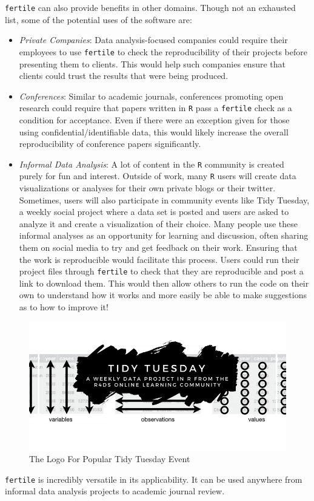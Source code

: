 \documentclass[12pt,twoside]{reedthesis}
\begin{document}
\texttt{fertile} can also provide benefits in other domains. Though not an exhausted list, some of the potential uses of the software are:
\begin{itemize}
\item
  \emph{Private Companies}: Data analysis-focused companies could require their employees to use \texttt{fertile} to check the reproducibility of their projects before presenting them to clients. This would help such companies ensure that clients could trust the results that were being produced.
\item
  \emph{Conferences}: Similar to academic journals, conferences promoting open research could require that papers written in \texttt{R} pass a \texttt{fertile} check as a condition for acceptance. Even if there were an exception given for those using confidential/identifiable data, this would likely increase the overall reproducibility of conference papers significantly.
\item
  \emph{Informal Data Analysis}: A lot of content in the \texttt{R} community is created purely for fun and interest. Outside of work, many \texttt{R} users will create data visualizations or analyses for their own private blogs or their twitter. Sometimes, users will also participate in community events like Tidy Tuesday, a weekly social project where a data set is posted and users are asked to analyze it and create a visualization of their choice. Many people use these informal analyses as an opportunity for learning and discussion, often sharing them on social media to try and get feedback on their work. Ensuring that the work is reproducible would facilitate this process. Users could run their project files through \texttt{fertile} to check that they are reproducible and post a link to download them. This would then allow others to run the code on their own to understand how it works and more easily be able to make suggestions as to how to improve it!
\end{itemize}
\begin{figure}
\includegraphics[width=1\linewidth]{figure/tidytuesday} \caption{The Logo For Popular Tidy Tuesday Event}\label{fig:unnamed-chunk-61}
\end{figure}
\texttt{fertile} is incredibly versatile in its applicability. It can be used anywhere from informal data analysis projects to academic journal review.
\end{document}

